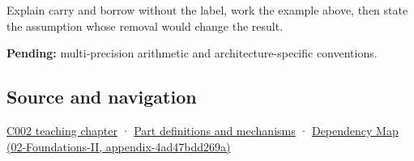 Explain carry and borrow without the label, work the example above, then state the assumption whose removal would change the result.

\textbf{Pending:} multi-precision arithmetic and architecture-specific conventions.

\subsection{Source and navigation}\label{appendix-d52d5f78ffd1-source-and-navigation}

\hyperref[01-foundations-i-ch001-arithmetic-becomes-a-policy]{C002 teaching chapter} · \hyperref[appendix-fd090d982a15]{Part definitions and mechanisms} · \href{../02-Foundations-II/main.pdf\#nameddest=appendix-4ad47bdd269a}{Dependency Map (02-Foundations-II, appendix-4ad47bdd269a)}
